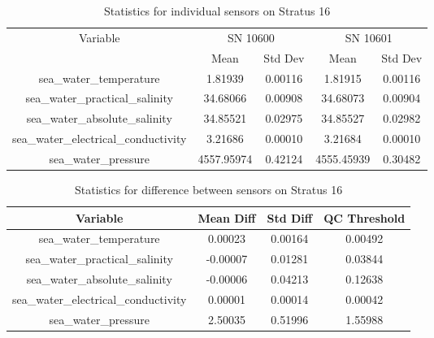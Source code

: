 \begin{table}[h]
\centering
\begin{tabular}{|c|c|c|c|c|}
\hline
Variable & \multicolumn{2}{c|}{SN 10600} & \multicolumn{2}{c|}{SN 10601} \\
& Mean & Std Dev & Mean & Std Dev \\
\hline
sea\_water\_temperature & 1.81939 & 0.00116 & 1.81915 & 0.00116 \\
sea\_water\_practical\_salinity & 34.68066 & 0.00908 & 34.68073 & 0.00904 \\
sea\_water\_absolute\_salinity & 34.85521 & 0.02975 & 34.85527 & 0.02982 \\
sea\_water\_electrical\_conductivity & 3.21686 & 0.00010 & 3.21684 & 0.00010 \\
sea\_water\_pressure & 4557.95974 & 0.42124 & 4555.45939 & 0.30482 \\
\hline
\end{tabular}
\caption{Statistics for individual sensors on Stratus 16}
\end{table}

\begin{table}[h]
\centering
\begin{tabular}{|c|c|c|c|}
\hline
Variable & Mean Diff & Std Diff & QC Threshold \\
\hline
sea\_water\_temperature & 0.00023 & 0.00164 & 0.00492 \\
sea\_water\_practical\_salinity & -0.00007 & 0.01281 & 0.03844 \\
sea\_water\_absolute\_salinity & -0.00006 & 0.04213 & 0.12638 \\
sea\_water\_electrical\_conductivity & 0.00001 & 0.00014 & 0.00042 \\
sea\_water\_pressure & 2.50035 & 0.51996 & 1.55988 \\
\hline
\end{tabular}
\caption{Statistics for difference between sensors on Stratus 16}
\end{table}
